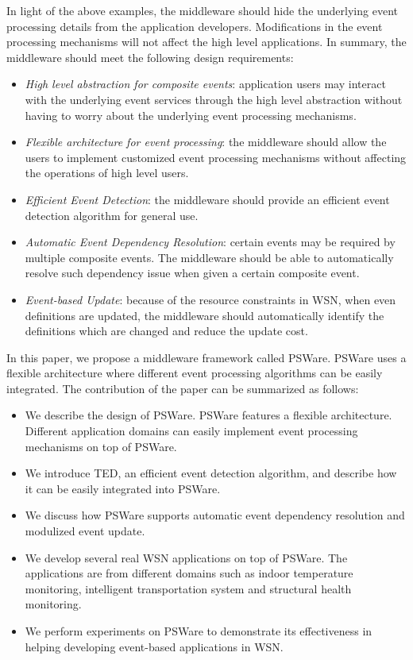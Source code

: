 In light of the above examples, the middleware should hide the underlying event processing details from the application developers. Modifications in the event processing mechanisms will not affect the high level applications. In summary, the middleware should meet the following design requirements:
\begin{itemize}
\item \emph{High level abstraction for composite events}: application users may interact with the underlying event services through the high level abstraction without having to worry about the underlying event processing mechanisms.
\item \emph{Flexible architecture for event processing}: the middleware should allow the users to implement customized event processing mechanisms without affecting the operations of high level users.
\item \emph{Efficient Event Detection}: the middleware should provide an efficient event detection algorithm for general use.
\item \emph{Automatic Event Dependency Resolution}: certain events may be required by multiple composite events. The middleware should be able to automatically resolve such dependency issue when given a certain composite event.
\item \emph{Event-based Update}: because of the resource constraints in WSN, when even definitions are updated, the middleware should automatically identify the definitions which are changed and reduce the update cost.
\end{itemize}

In this paper, we propose a middleware framework called PSWare. PSWare uses a flexible architecture where different event processing algorithms can be easily integrated. The contribution of the paper can be summarized as follows:
\begin{itemize}
\item We describe the design of PSWare. PSWare features a flexible architecture. Different application domains can easily implement event processing mechanisms on top of PSWare.
\item We introduce TED, an efficient event detection algorithm, and describe how it can be easily integrated into PSWare.
\item We discuss how PSWare supports automatic event dependency resolution and modulized event update.
\item We develop several real WSN applications on top of PSWare. The applications are from different domains such as indoor temperature monitoring, intelligent transportation system and structural health monitoring.
\item We perform experiments on PSWare to demonstrate its effectiveness in helping developing event-based applications in WSN.
\end{itemize}

